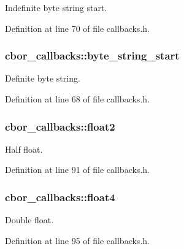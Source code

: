Indefinite byte string start. 



Definition at line 70 of file callbacks.\-h.

\hypertarget{structcbor__callbacks_adf65a04d2423dcdd73cec4a261ccb6aa}{
\subsubsection[{byte\-\_\-string\-\_\-start}]{ cbor\-\_\-callbacks\-::byte\-\_\-string\-\_\-start}}\label{structcbor__callbacks_adf65a04d2423dcdd73cec4a261ccb6aa}


Definite byte string. 



Definition at line 68 of file callbacks.\-h.

\hypertarget{structcbor__callbacks_ab1f4ab3a5bf0cf2a6418b8cb28877652}{
\subsubsection[{float2}]{ cbor\-\_\-callbacks\-::float2}}\label{structcbor__callbacks_ab1f4ab3a5bf0cf2a6418b8cb28877652}


Half float. 



Definition at line 91 of file callbacks.\-h.

\hypertarget{structcbor__callbacks_a3e0e5094fdfbc527f9a2ca300d65b7df}{
\subsubsection[{float4}]{ cbor\-\_\-callbacks\-::float4}}\label{structcbor__callbacks_a3e0e5094fdfbc527f9a2ca300d65b7df}


Double float. 



Definition at line 95 of file callbacks.\-h.

